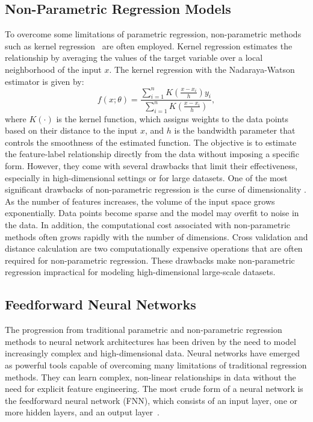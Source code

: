 \subsection{Non-Parametric Regression Models}
To overcome some limitations of parametric regression, non-parametric methods such as kernel regression~\citep{hastie2009elements} are often employed. 
Kernel regression estimates the relationship by averaging the values of the target variable over a local neighborhood of the input $x$.
The kernel regression with the Nadaraya-Watson estimator is given by:
\begin{equation}
    f(x; \theta) = \frac{\sum_{i=1}^{n} K\left(\frac{x-x_i}{h}\right) y_i}{\sum_{i=1}^{n} K\left(\frac{x-x_i}{h}\right)},
\end{equation}
where $K(\cdot)$ is the kernel function, which assigns weights to the data points based on their distance to the input $x$, and $h$ is the bandwidth parameter that controls the smoothness of the estimated function.
The objective is to estimate the feature-label relationship directly from the data without imposing a specific form.
However, they come with several drawbacks that limit their effectiveness, especially in high-dimensional settings or for large datasets. 
One of the most significant drawbacks of non-parametric regression is the curse of dimensionality \cite{bellman1966dynamic}. 
As the number of features increases, the volume of the input space grows exponentially.
Data points become sparse and the model may overfit to noise in the data.
In addition, the computational cost associated with non-parametric methods often grows rapidly with the number of dimensions.
Cross validation and distance calculation are two computationally expensive operations that are often required for non-parametric regression.
These drawbacks make non-parametric regression impractical for modeling high-dimensional large-scale datasets. 

\subsection{Feedforward Neural Networks}

The progression from traditional parametric and non-parametric regression methods to neural network architectures has been driven by the need to model increasingly complex and high-dimensional data.
Neural networks have emerged as powerful tools capable of overcoming many limitations of traditional regression methods. 
They can learn complex, non-linear relationships in data without the need for explicit feature engineering.
The most crude form of a neural network is the feedforward neural network (FNN), which consists of an input layer, one or more hidden layers, and an output layer~\citep{goodfellow2016}.

